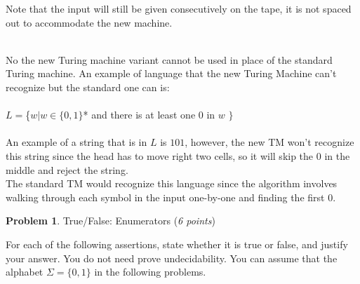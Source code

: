 \documentclass[11pt]{article}
\theoremstyle{definition}
\theoremstyle{theorem}
\newtheorem{prob}{Problem}
\newcommand{\solution}{\medskip\noindent{\color{blue}\textbf{Solution:}}}
\begin{document}
Note that the input will still be given consecutively on the tape, it is not spaced out to accommodate the new machine.

\solution \\
No the new Turing machine variant cannot be used in place of the standard Turing machine. An example of language that the new Turing Machine can't recognize but the standard one can is: \\ ~ \\

\noindent $L = $\{$ w | w \in \{0, 1\}$* and there is at least one 0 in $w$ $\}$ \\~\\

\noindent An example of a string that is in $L$ is $101$, however, the new TM won't recognize this string since the head has to move right two cells, so it will skip the 0 in the middle and reject the string. \\ 

\noindent The standard TM would recognize this language since the algorithm involves walking through each symbol in the input one-by-one and finding the first 0. 

\newpage

\begin{prob} True/False: Enumerators (\emph{6 points})\end{prob}


For each of the following assertions, state whether it is true or false, and justify your answer. You do not need prove undecidability. You can assume that the alphabet $\Sigma = \{0, 1\}$ in the following problems.
\end{document}
